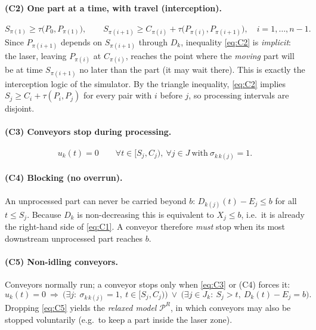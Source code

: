 \documentclass[11pt,a4paper]{article}
\theoremstyle{definition}
\theoremstyle{remark}
\newcommand{\Pb}{\mathcal{P}}
\begin{document}
\paragraph{(C2) One part at a time, with travel (interception).}
\begin{equation}\label{eq:C2}
S_{\pi(1)}\ge\tau\bigl(P_0,P_{\pi(1)}\bigr),\qquad
S_{\pi(i+1)}\ge C_{\pi(i)}+\tau\bigl(P_{\pi(i)},P_{\pi(i+1)}\bigr),\quad i=1,\dots,n-1.
\end{equation}
Since $P_{\pi(i+1)}$ depends on $S_{\pi(i+1)}$ through $D_k$, inequality
\eqref{eq:C2} is \emph{implicit}: the laser, leaving $P_{\pi(i)}$ at $C_{\pi(i)}$,
reaches the point where the \emph{moving} part will be at time $S_{\pi(i+1)}$ no later
than the part (it may wait there). This is exactly the interception logic of the
simulator. By the triangle inequality, \eqref{eq:C2} implies
$S_j\ge C_i+\tau(P_i,P_j)$ for every pair with $i$ before $j$, so processing intervals
are disjoint.

\paragraph{(C3) Conveyors stop during processing.}
\begin{equation}\label{eq:C3}
u_k(t)=0\qquad\forall t\in[S_j,C_j),\ \forall j\in J\ \text{with}\ \sigma_{k\,k(j)}=1 .
\end{equation}

\paragraph{(C4) Blocking (no overrun).} An unprocessed part can never be carried
beyond $b$: $D_{k(j)}(t)-E_j\le b$ for all $t\le S_j$. Because $D_k$ is
non-decreasing this is equivalent to $X_j\le b$, i.e.\ it is already the right-hand side
of \eqref{eq:C1}. A conveyor therefore \emph{must} stop when its most downstream
unprocessed part reaches $b$.

\paragraph{(C5) Non-idling conveyors.} Conveyors normally run; a conveyor stops only
when \eqref{eq:C3} or (C4) forces it:
\begin{equation}\label{eq:C5}
u_k(t)=0\ \Longrightarrow\
\bigl(\exists j:\ \sigma_{k\,k(j)}=1,\ t\in[S_j,C_j)\bigr)\ \lor\
\bigl(\exists j\in J_k:\ S_j>t,\ D_k(t)-E_j=b\bigr).
\end{equation}
Dropping \eqref{eq:C5} yields the \emph{relaxed model} $\Pb^R$, in which conveyors may
also be stopped voluntarily (e.g.\ to keep a part inside the laser zone).
\end{document}
